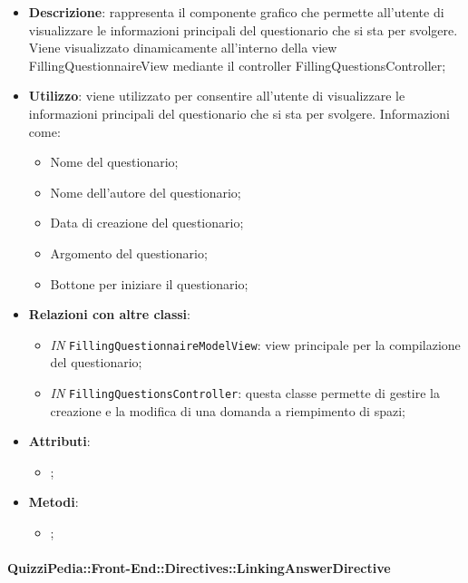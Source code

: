 		\begin{itemize}
			\item \textbf{Descrizione}: rappresenta il componente grafico che permette all'utente di visualizzare le informazioni principali del questionario che si sta per svolgere. Viene visualizzato dinamicamente all'interno della view FillingQuestionnaireView mediante il controller FillingQuestionsController;
			\item \textbf{Utilizzo}: viene utilizzato per consentire all'utente di visualizzare le informazioni principali del questionario che si sta per svolgere. Informazioni come:
			\begin{itemize}
				\item Nome del questionario;
				\item Nome dell'autore del questionario;
				\item Data di creazione del questionario;
				\item Argomento del questionario;
				\item Bottone per iniziare il questionario;
			\end{itemize}
			\item \textbf{Relazioni con altre classi}: 
			\begin{itemize}
				\item \textit{IN} \texttt{FillingQuestionnaireModelView}: view principale per la compilazione del questionario;
				\item \textit{IN} \texttt{FillingQuestionsController}: questa classe permette di gestire la creazione e la modifica di una domanda a riempimento di spazi;
			\end{itemize}
			\item \textbf{Attributi}: 
			\begin{itemize}
				\item ;
			\end{itemize}
			\item \textbf{Metodi}: 
			\begin{itemize}
				\item ;
			\end{itemize}
		\end{itemize}
		
		\paragraph{QuizziPedia::Front-End::Directives::LinkingAnswerDirective}
		
		\label{QuizziPedia::Front-End::Directives::LinkingAnswerDirective}
		
